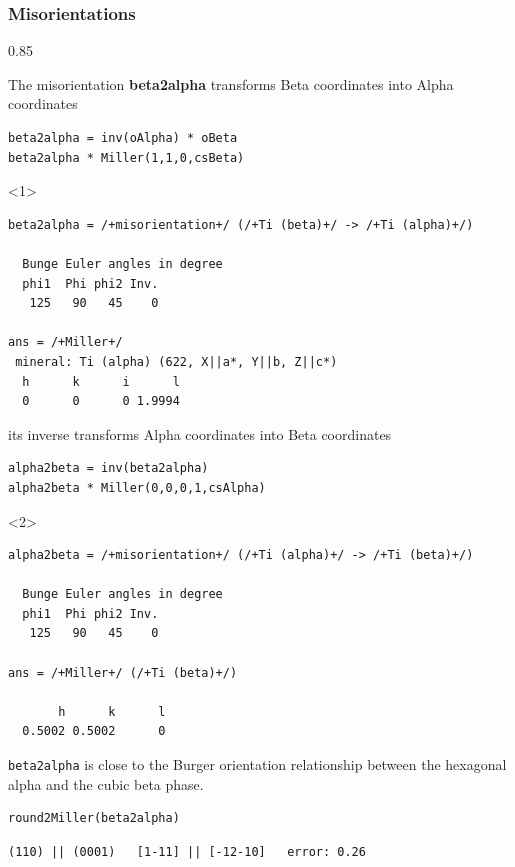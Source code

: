 \documentclass[compress,aspectratio=1610,fleqn]{beamer}
\begin{document}
\begin{frame}[fragile]
  \frametitle{Misorientations}

  \begin{overlayarea}{\textwidth}{0.85\textheight}

    The \alert{misorientation} {\bf beta2alpha} transforms Beta coordinates into Alpha coordinates
\vspace{-0.1cm}
\begin{lstlisting}[style=input]
beta2alpha = inv(oAlpha) * oBeta
beta2alpha * Miller(1,1,0,csBeta)
\end{lstlisting}

\begin{onlyenv}<1>
  \vspace{-.3cm}
  \begin{lstlisting}[style=output]
beta2alpha = /+misorientation+/ (/+Ti (beta)+/ -> /+Ti (alpha)+/)

  Bunge Euler angles in degree
  phi1  Phi phi2 Inv.
   125   90   45    0

ans = /+Miller+/
 mineral: Ti (alpha) (622, X||a*, Y||b, Z||c*)
  h      k      i      l
  0      0      0 1.9994
 \end{lstlisting}
\end{onlyenv}

  \pause
  \medskip
its inverse transforms Alpha coordinates into Beta
coordinates
\vspace{-0.2cm}
\begin{lstlisting}[style=input]
alpha2beta = inv(beta2alpha)
alpha2beta * Miller(0,0,0,1,csAlpha)
\end{lstlisting}
  \begin{onlyenv}<2>
  \vspace{-.3cm}
  \begin{lstlisting}[style=output]
alpha2beta = /+misorientation+/ (/+Ti (alpha)+/ -> /+Ti (beta)+/)

  Bunge Euler angles in degree
  phi1  Phi phi2 Inv.
   125   90   45    0

ans = /+Miller+/ (/+Ti (beta)+/)

       h      k      l
  0.5002 0.5002      0
 \end{lstlisting}
\end{onlyenv}


\pause
\medskip

\texttt{beta2alpha} is close to the Burger orientation relationship
between the hexagonal alpha and the cubic beta phase.
\vspace{-0.2cm}
\begin{lstlisting}[style=input]
round2Miller(beta2alpha)
\end{lstlisting}
  \vspace{-.3cm}
  \begin{lstlisting}[style=output]
(110) || (0001)   [1-11] || [-12-10]   error: 0.26
 \end{lstlisting}


\end{overlayarea}
\end{frame}
\end{document}
